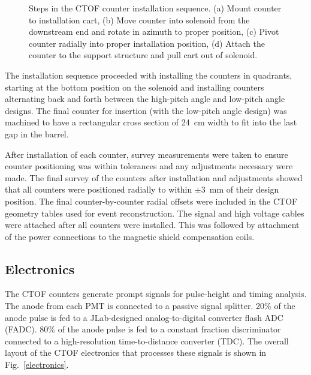 \documentclass{elsart}
\begin{document}
\begin{figure}[htbp]
\begin{picture}
\end{picture} 
\caption{Steps in the CTOF counter installation sequence. (a) Mount counter to installation cart, (b) Move
counter into solenoid from the downstream end and rotate in azimuth to proper position, (c) Pivot counter
radially into proper installation position, (d) Attach the counter to the support structure and pull cart out of
solenoid.}
\label{install}
\end{figure}

The installation sequence proceeded with installing the counters in quadrants, starting at the bottom
position on the solenoid and installing counters alternating back and forth between the high-pitch
angle and low-pitch angle designs. The final counter for insertion (with the low-pitch angle design) was
machined to have a rectangular cross section of 24~cm width to fit into the last gap in the barrel.

After installation of each counter, survey measurements were taken to ensure counter positioning 
was within tolerances and any adjustments necessary were made. The final survey of the counters
after installation and adjustments showed that all counters were positioned radially to within $\pm$3~mm
of their design position. The final counter-by-counter radial offsets were included in the CTOF geometry
tables used for event reconstruction. The signal and high voltage cables were attached after all counters
were installed. This was followed by attachment of the power connections to the magnetic shield compensation
coils.

\subsection{Electronics}
\label{sec-elec}

The CTOF counters generate prompt signals for pulse-height and timing analysis. The anode from 
each PMT is connected to a passive signal splitter. 20\% of the anode pulse is fed to a JLab-designed
analog-to-digital converter flash ADC (FADC). 80\% of the anode pulse is fed to a constant fraction
discriminator connected to a high-resolution time-to-distance converter (TDC). The overall layout of
the CTOF electronics that processes these signals is shown in Fig.~\ref{electronics}.
\end{document}
